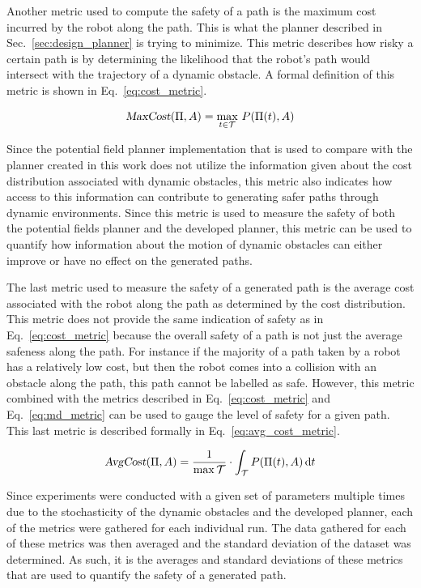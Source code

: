 Another metric used to compute the safety of a path is the maximum cost
incurred by the robot along the path. This is what the planner described in
Sec.~\ref{sec:design_planner} is trying to minimize. This metric describes how
risky a certain path is by determining the likelihood that the robot's path
would intersect with the trajectory of a dynamic obstacle. A formal definition
of this metric is shown in Eq.~\ref{eq:cost_metric}.

\begin{equation}
    \Var{MaxCost}(\Pi, A) = \max_{t \in \mathcal{T}} \, P(\Pi(t), A)
    \label{eq:cost_metric}
\end{equation}

Since the potential field planner implementation that is used to compare with
the planner created in this work does not utilize the information given about
the cost distribution associated with dynamic obstacles, this metric also
indicates how access to this information can contribute to generating safer
paths through dynamic environments. Since this metric is used to measure the
safety of both the potential fields planner and the developed planner, this
metric can be used to quantify how information about the motion of dynamic
obstacles can either improve or have no effect on the generated paths.

The last metric used to measure the safety of a generated path is the average
cost associated with the robot along the path as determined by the cost
distribution. This metric does not provide the same indication of safety as in
Eq.~\ref{eq:cost_metric} because the overall safety of a path is not just the
average safeness along the path.  For instance if the majority of a path taken
by a robot has a relatively low cost, but then the robot comes into a collision
with an obstacle along the path, this path cannot be labelled as safe.
However, this metric combined with the metrics described in
Eq.~\ref{eq:cost_metric} and Eq.~\ref{eq:md_metric} can be used to gauge the
level of safety for a given path. This last metric is described formally in
Eq.~\ref{eq:avg_cost_metric}.

\begin{equation}
    \Var{AvgCost}(\Pi, A) = \frac{1}{\max \mathcal{T}} \cdot
    \int_{\mathcal{T}} P(\Pi(t), A) \, \mathrm{d}t
    \label{eq:avg_cost_metric}
\end{equation}

Since experiments were conducted with a given set of parameters multiple times
due to the stochasticity of the dynamic obstacles and the developed planner,
each of the metrics were gathered for each individual run. The data gathered
for each of these metrics was then averaged and the standard deviation of the
dataset was determined. As such, it is the averages and standard deviations of
these metrics that are used to quantify the safety of a generated path.

